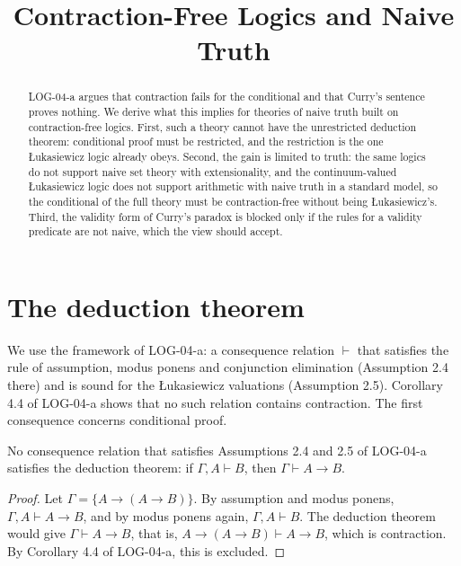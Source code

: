 \documentclass{situationist-preprint}
\title{Contraction-Free Logics and Naive Truth}
\begin{document}
\maketitle

\begin{abstract}
LOG-04-a argues that contraction fails for the conditional and that Curry's sentence proves nothing. We derive what this implies for theories of naive truth built on contraction-free logics. First, such a theory cannot have the unrestricted deduction theorem: conditional proof must be restricted, and the restriction is the one Łukasiewicz logic already obeys. Second, the gain is limited to truth: the same logics do not support naive set theory with extensionality, and the continuum-valued Łukasiewicz logic does not support arithmetic with naive truth in a standard model, so the conditional of the full theory must be contraction-free without being Łukasiewicz's. Third, the validity form of Curry's paradox is blocked only if the rules for a validity predicate are not naive, which the view should accept.
\end{abstract}

\section{The deduction theorem}

We use the framework of LOG-04-a: a consequence relation $\vdash$ that satisfies the rule of assumption, modus ponens and conjunction elimination (Assumption 2.4 there) and is sound for the Łukasiewicz valuations (Assumption 2.5). Corollary 4.4 of LOG-04-a shows that no such relation contains contraction. The first consequence concerns conditional proof.

\begin{proposition}\label{p:dt}
No consequence relation that satisfies Assumptions 2.4 and 2.5 of LOG-04-a satisfies the deduction theorem: if $\Gamma, A \vdash B$, then $\Gamma \vdash A \to B$.
\end{proposition}

\begin{proof}
Let $\Gamma = \{A \to (A \to B)\}$. By assumption and modus ponens, $\Gamma, A \vdash A \to B$, and by modus ponens again, $\Gamma, A \vdash B$. The deduction theorem would give $\Gamma \vdash A \to B$, that is, $A \to (A \to B) \vdash A \to B$, which is contraction. By Corollary 4.4 of LOG-04-a, this is excluded.
\end{proof}
\end{document}
